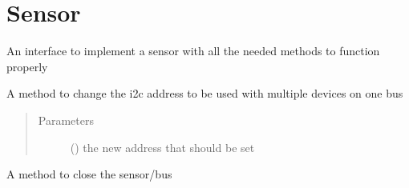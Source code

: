 \documentclass[letterpaper,10pt,english]{sphinxmanual}
\begin{document}
\ignorespaces 

\chapter{Sensor}
\label{\detokenize{sensor:sensor}}\label{\detokenize{sensor:index-0}}\label{\detokenize{sensor::doc}}

\begin{fulllineitems}
\label{\detokenize{sensor:lib.sensor.SensorInterface}}
An interface to implement a sensor with all the needed methods to function properly

\begin{fulllineitems}
\label{\detokenize{sensor:lib.sensor.SensorInterface.change_addr}}
A method to change the i2c address to be used with multiple devices on one bus
\begin{quote}\begin{description}
\item[{Parameters}] \leavevmode
{} () \textendash{} the new address that should be set

\end{description}\end{quote}

\end{fulllineitems}


\begin{fulllineitems}
\label{\detokenize{sensor:lib.sensor.SensorInterface.close}}
A method to close the sensor/bus

\end{fulllineitems}


\end{fulllineitems}
\end{document}
